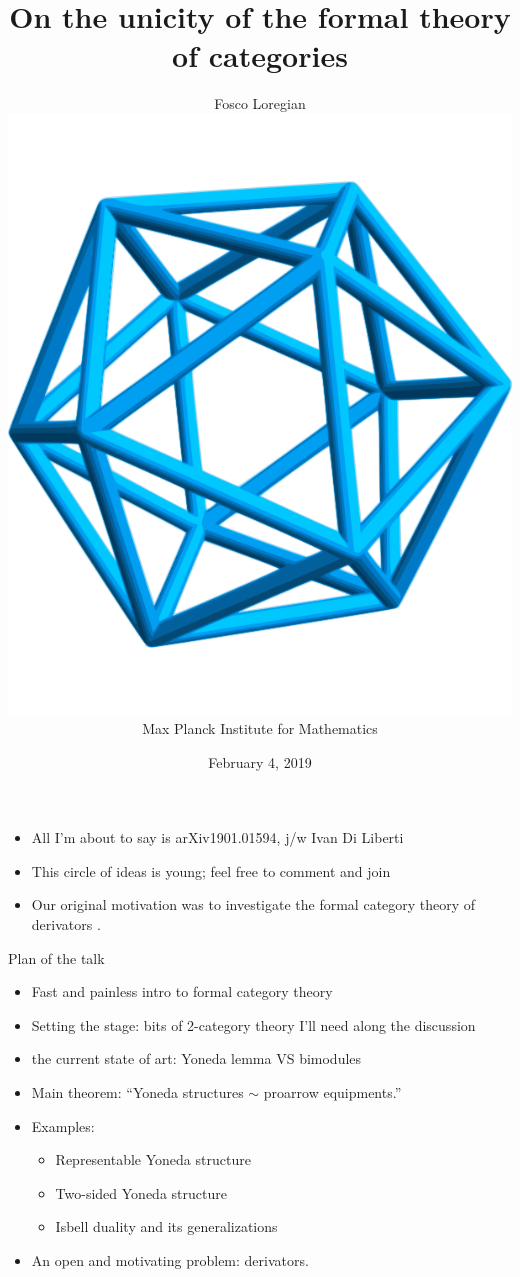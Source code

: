 \documentclass{beamer}
\author[Fosco Loregian]{%
	Fosco Loregian \\ 
	\includegraphics[scale=.05]{MPIM.png} \\ 
	Max Planck Institute for Mathematics%
}
\title[Unicity]{On the unicity of the formal theory of categories}
\date{February 4, 2019}
\begin{document}
\begin{frame}
	\maketitle
\end{frame}

\begin{frame}
	\begin{itemize}
		\item<1-> All I'm about to say is \alert{arXiv1901.01594}, j/w Ivan Di Liberti
		\item<2-> This circle of ideas is young; feel free to comment and join
		\item<3-> Our original motivation was to investigate the \alert{formal category theory of derivators }.
	\end{itemize}
\end{frame}

\begin{frame}{Plan of the talk}
	\begin{itemize}
		\item<1-> Fast and painless intro to formal category theory
		\item<2-> Setting the stage: bits of 2-category theory I'll need along the discussion
		\item<3-> the current state of art: Yoneda lemma VS bimodules
		\item<4-> \alert{Main theorem}: ``Yoneda structures $\sim$ proarrow equipments.''
		\item<5-> Examples:
		      \begin{itemize}
			      \item Representable Yoneda structure
			      \item Two-sided Yoneda structure
			      \item Isbell duality and its generalizations
		      \end{itemize}
		\item<6-> An open and motivating problem: derivators.
	\end{itemize}
\end{frame}
\end{document}

